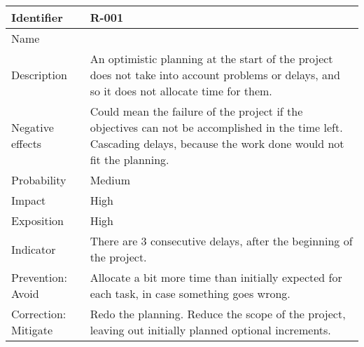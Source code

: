 \begin{table}[H]
	\begin{tabularx}{\textwidth}{|y|z|}
		\hline
		Identifier & \textbf{R-001} \\ \hline
		Name & \Runo \\ \hline
		Description &
			An optimistic planning at the start of the project does not take into account problems or delays, and so it does not allocate time for them.
		\\ \hline
		Negative effects &
			Could mean the failure of the project if the objectives can not be accomplished in the time left. \linej
			Cascading delays, because the work done would not fit the planning.
		\\ \hline
		Probability & Medium\\ \hline
		Impact &  High\\ \hline
		Exposition &  High\\ \hline
		Indicator & There are 3 consecutive delays, after the beginning of the project.\\ \hline
		Prevention: Avoid &
			Allocate a bit more time than initially expected for each task, in case something goes wrong.
		\\ \hline
		Correction: Mitigate &
			Redo the planning. \linej
			Reduce the scope of the project, leaving out initially planned optional increments.
		\\ \hline
	\end{tabularx}
\end{table}

